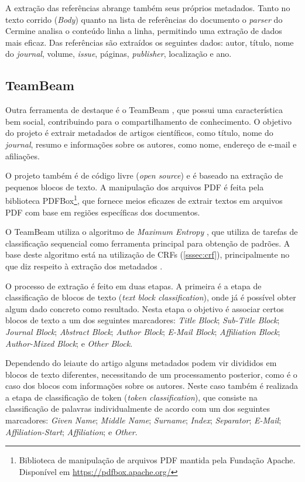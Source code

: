 A extração das referências abrange também seus próprios metadados. Tanto no texto corrido (\textit{Body}) quanto na lista de referências do documento o \textit{parser} do Cermine analisa o conteúdo linha a linha, permitindo uma extração de dados mais eficaz. Das referências são extraídos os seguintes dados: autor, título, nome do \textit{journal}, volume, \textit{issue}, páginas, \textit{publisher}, localização e ano.

\subsection{TeamBeam}
\label{ssec:teambeam}

Outra ferramenta de destaque é o TeamBeam \cite{teambeam}, que possui uma característica bem social, contribuindo para o compartilhamento de conhecimento. O objetivo do projeto é extrair metadados de artigos científicos, como título, nome do \textit{journal}, resumo e informações sobre os autores, como nome, endereço de e-mail e afiliações.

O projeto também é de código livre (\textit{open source}) e é baseado na extração de pequenos blocos de texto. A manipulação dos arquivos PDF é feita pela biblioteca PDFBox\footnote{Biblioteca de manipulação de arquivos PDF mantida pela Fundação Apache. Disponível em \url{https://pdfbox.apache.org/}}, que fornece meios eficazes de extrair textos em arquivos PDF com base em regiões específicas dos documentos.

O TeamBeam utiliza o algoritmo de \textit{Maximum Entropy} \cite{maximum-entropy}, que utiliza de tarefas de classificação sequencial como ferramenta principal para obtenção de padrões. A base deste algoritmo está na utilização de CRFs (\autoref{sssec:crf}), principalmente no que diz respeito à extração dos metadados \cite{Peng-CRF-IE}.

O processo de extração é feito em duas etapas. A primeira é a etapa de classificação de blocos de texto (\textit{text block classification}), onde já é possível obter algum dado concreto como resultado. Nesta etapa o objetivo é associar certos blocos de texto a um dos seguintes marcadores: \textit{Title Block}; \textit{Sub-Title Block}; \textit{Journal Block}; \textit{Abstract Block}; \textit{Author Block}; \textit{E-Mail Block}; \textit{Affiliation Block}; \textit{Author-Mixed Block}; e \textit{Other Block}.

Dependendo do leiaute do artigo alguns metadados podem vir divididos em blocos de texto diferentes, necessitando de um processamento posterior, como é o caso dos blocos com informações sobre os autores. Neste caso também é realizada a etapa de classificação de token (\textit{token classification}), que consiste na classificação de palavras individualmente de acordo com um dos seguintes marcadores: \textit{Given Name}; \textit{Middle Name}; \textit{Surname}; \textit{Index}; \textit{Separator}; \textit{E-Mail}; \textit{Affiliation-Start}; \textit{Affiliation}; e \textit{Other}.

